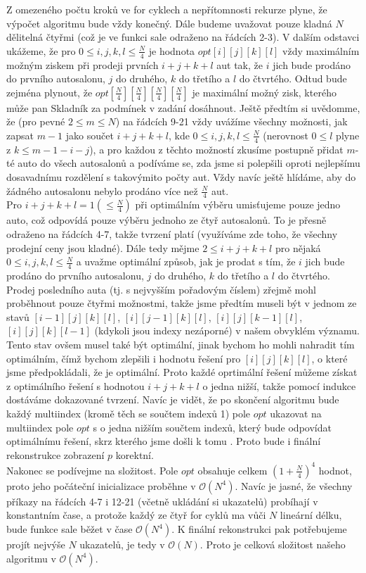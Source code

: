 \documentclass[12pt,a4paper]{article}
\theoremstyle{plain}
\begin{document}
Z omezeného počtu kroků ve for cyklech a nepřítomnosti rekurze plyne, že výpočet algoritmu bude vždy konečný. Dále budeme uvažovat pouze kladná $N$ dělitelná čtyřmi (což je ve funkci sale odraženo na řádcích 2-3). V dalším odstavci ukážeme, že pro $0\leq i,j,k,l\leq \frac{N}{4}$ je hodnota $opt[i][j][k][l]$ vždy maximálním možným ziskem při prodeji prvních $i+j+k+l$ aut tak, že $i$ jich bude prodáno do prvního autosalonu, $j$ do druhého, $k$ do třetího a $l$ do čtvrtého. Odtud bude zejména plynout, že $opt[\frac{N}{4}][\frac{N}{4}][\frac{N}{4}][\frac{N}{4}]$ je maximální možný zisk, kterého může pan Skladník za podmínek v zadání dosáhnout. Ještě předtím si uvědomme, že (pro pevné $2\leq m\leq N$) na řádcích 9-21 vždy uvážíme všechny možnosti, jak zapsat $m-1$ jako součet $i+j+k+l$, kde $0\leq i,j,k,l\leq \frac{N}{4}$ (nerovnost $0\leq l$ plyne z $k\leq m-1-i-j$), a pro každou z těchto možností zkusíme postupně přidat $m$-té auto do všech autosalonů a podíváme se, zda jsme si polepšili oproti nejlepšímu dosavadnímu rozdělení s takovýmito počty aut. Vždy navíc ještě hlídáme, aby do žádného autosalonu nebylo prodáno více než $\frac{N}{4}$ aut.\\

Pro $i+j+k+l=1 (\leq \frac{N}{4})$ při optimálním výběru umisťujeme pouze jedno auto, což odpovídá pouze výběru jednoho ze čtyř autosalonů. To je přesně odraženo na řádcích 4-7, takže tvrzení platí (využíváme zde toho, že všechny prodejní ceny jsou kladné). Dále tedy mějme $2\leq i+j+k+l$ pro nějaká $0\leq i,j,k,l\leq \frac{N}{4}$ a uvažme optimální způsob, jak je prodat s tím, že $i$ jich bude prodáno do prvního autosalonu, $j$ do druhého, $k$ do třetího a $l$ do čtvrtého. Prodej posledního auta (tj. s nejvyšším pořadovým číslem) zřejmě mohl proběhnout pouze čtyřmi možnostmi, takže jsme předtím museli být v jednom ze stavů $[i-1][j][k][l]$, $[i][j-1][k][l]$, $[i][j][k-1][l]$, $[i][j][k][l-1]$ (kdykoli jsou indexy nezáporné) v našem obvyklém významu. Tento stav ovšem musel také být optimální, jinak bychom ho mohli nahradit tím optimálním, čímž bychom zlepšili i hodnotu řešení pro $[i][j][k][l]$, o které jsme předpokládali, že je optimální. Proto každé oprtimální řešení můžeme získat z optimálního řešení s hodnotou $i+j+k+l$ o jedna nižší, takže pomocí indukce dostáváme dokazované tvrzení. Navíc je vidět, že po skončení algoritmu bude každý multiindex (kromě těch se součtem indexů 1) pole $opt$ ukazovat na multiindex pole $opt$ s o jedna nižším součtem indexů, který bude odpovídat optimálnímu řešení, skrz kterého jsme došli k tomu . Proto bude i finální rekonstrukce zobrazení $p$ korektní.\\

Nakonec se podívejme na složitost. Pole $opt$ obsahuje celkem $(1+\frac{N}{4})^4$ hodnot, proto jeho počáteční inicializace proběhne v $\mathcal{O}(N^4)$. Navíc je jasné, že všechny příkazy na řádcích 4-7 i 12-21 (včetně ukládání si ukazatelů) probíhají v konstantním čase, a protože každý ze čtyř for cyklů ma vůči $N$ lineární délku, bude funkce sale běžet v čase $\mathcal{O}(N^4)$. K finální rekonstrukci pak potřebujeme projít nejvýše $N$ ukazatelů, je tedy v $\mathcal{O}(N)$. Proto je celková složitost našeho algoritmu v $\mathcal{O}(N^4)$.
\end{document}
